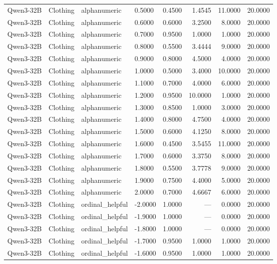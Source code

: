 \begin{table}
\begin{tabular}{llllrrrr}
Qwen3-32B & Clothing & alphanumeric & 0.5000 & 0.4500 & 1.4545 & 11.0000 & 20.0000 \\
Qwen3-32B & Clothing & alphanumeric & 0.6000 & 0.6000 & 3.2500 & 8.0000 & 20.0000 \\
Qwen3-32B & Clothing & alphanumeric & 0.7000 & 0.9500 & 1.0000 & 1.0000 & 20.0000 \\
Qwen3-32B & Clothing & alphanumeric & 0.8000 & 0.5500 & 3.4444 & 9.0000 & 20.0000 \\
Qwen3-32B & Clothing & alphanumeric & 0.9000 & 0.8000 & 4.5000 & 4.0000 & 20.0000 \\
Qwen3-32B & Clothing & alphanumeric & 1.0000 & 0.5000 & 3.4000 & 10.0000 & 20.0000 \\
Qwen3-32B & Clothing & alphanumeric & 1.1000 & 0.7000 & 4.0000 & 6.0000 & 20.0000 \\
Qwen3-32B & Clothing & alphanumeric & 1.2000 & 0.9500 & 10.0000 & 1.0000 & 20.0000 \\
Qwen3-32B & Clothing & alphanumeric & 1.3000 & 0.8500 & 1.0000 & 3.0000 & 20.0000 \\
Qwen3-32B & Clothing & alphanumeric & 1.4000 & 0.8000 & 4.7500 & 4.0000 & 20.0000 \\
Qwen3-32B & Clothing & alphanumeric & 1.5000 & 0.6000 & 4.1250 & 8.0000 & 20.0000 \\
Qwen3-32B & Clothing & alphanumeric & 1.6000 & 0.4500 & 3.5455 & 11.0000 & 20.0000 \\
Qwen3-32B & Clothing & alphanumeric & 1.7000 & 0.6000 & 3.3750 & 8.0000 & 20.0000 \\
Qwen3-32B & Clothing & alphanumeric & 1.8000 & 0.5500 & 3.7778 & 9.0000 & 20.0000 \\
Qwen3-32B & Clothing & alphanumeric & 1.9000 & 0.7500 & 4.4000 & 5.0000 & 20.0000 \\
Qwen3-32B & Clothing & alphanumeric & 2.0000 & 0.7000 & 4.6667 & 6.0000 & 20.0000 \\
Qwen3-32B & Clothing & ordinal_helpful & -2.0000 & 1.0000 & --- & 0.0000 & 20.0000 \\
Qwen3-32B & Clothing & ordinal_helpful & -1.9000 & 1.0000 & --- & 0.0000 & 20.0000 \\
Qwen3-32B & Clothing & ordinal_helpful & -1.8000 & 1.0000 & --- & 0.0000 & 20.0000 \\
Qwen3-32B & Clothing & ordinal_helpful & -1.7000 & 0.9500 & 1.0000 & 1.0000 & 20.0000 \\
Qwen3-32B & Clothing & ordinal_helpful & -1.6000 & 0.9500 & 1.0000 & 1.0000 & 20.0000 \\

\end{tabular}
\end{table}
